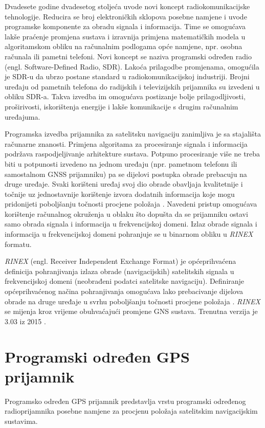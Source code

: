 \documentclass[a4paper,twoside,12pt]{memoir} %
\begin{document}
Dvadesete godine dvadesetog stoljeća uvode novi koncept radiokomunikacijske tehnologije.
Reducira se broj elektroničkih sklopova posebne namjene i uvode programske komponente za obradu signala i informacija. Time se omogućava lakše praćenje promjena sustava i izravnija primjena matematičkih modela u algoritamskom obliku na računalnim podlogama opće namjene, npr. osobna računala ili pametni telefoni.
Novi koncept se naziva programski određen radio (engl. Software-Defined Radio, SDR).
Lakoća prilagodbe promjenama, omogućila je SDR-u da ubrzo postane standard u radiokomunikacijskoj industriji.
Brojni uređaju od pametnih telefona do radijskih i televizijskih prijamnika su izvedeni u obliku SDR-a. Takva izvedba im omogućava postizanje bolje prilagodljivosti, proširivosti, iskorištenja energije i lakše komunikacije s drugim računalnim uređajuma. 

Programska izvedba prijamnika za satelitsku navigaciju zanimljiva je sa stajališta računarne
znanosti. Primjena algoritama za procesiranje signala i informacija podržava raspodjeljivanje
arhitekture sustava. Potpuno procesiranje više ne treba biti u potpunosti izvedeno na jednom uređaju
(npr. pametnom telefonu ili samostalnom GNSS prijamniku) pa se dijelovi postupka obrade prebacuju na druge uređaje. Svaki korišteni uređaj svoj dio obrade obavljaja kvalitetnije i točnije uz jednostavnije
korištenje izvora dodatnih informacija koje mogu pridonijeti poboljšanju točnosti procjene
položaja \cite{ref:46,ref:47}. Navedeni pristup omogućava korištenje računalnog okruženja u
oblaku što dopušta da se prijamniku ostavi samo obrada signala i informacija u frekvencijskoj
domeni. Izlaz obrade signala i informacija u frekvencijskoj domeni pohranjuje se u binarnom obliku
u \textit{RINEX} formatu.

\textit{RINEX}\label{sssec:rinex}
(engl. Receiver Independent Exchange Format) je općeprihvaćena definicija
pohranjivanja izlaza obrade (navigacijskih) satelitskih signala u frekvencijskoj domeni (neobrađeni podatci satelitske navigaciju).
Definiranje općeprihvaćenog načina pohranjivanja omogućava lako prebacivanje dijelova obrade 
na druge uređaje u svrhu poboljšanju točnosti procjene
položaja \cite{ref:46,ref:47}.
\textit{RINEX} se mijenja kroz vrijeme obuhvaćajući promjene GNS sustava. Trenutna verzija je
3.03 iz 2015 \cite{rinex:303}.

\section{Programski određen GPS prijamnik}
Programsko određen GPS prijamnik predstavlja vrstu programski određenog radioprijamnika posebne namjene za procjenu položaja satelitskim navigacijskim sustavima.
\end{document}
